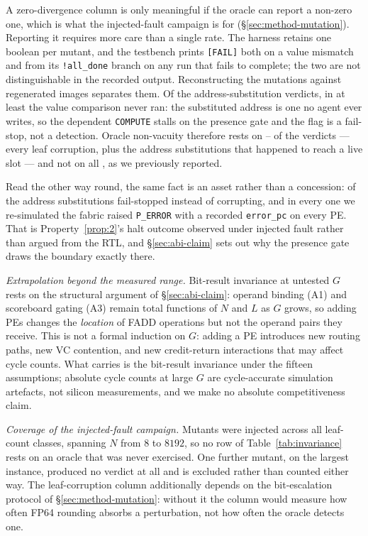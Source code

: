 \documentclass[journal,10pt]{IEEEtran}
\theoremstyle{plain}
\theoremstyle{definition}
\theoremstyle{remark}
\newcommand{\sv}[1]{\texttt{#1}}
\begin{document}
A zero-divergence column is only meaningful if the oracle can report a
non-zero one, which is what the injected-fault campaign is for
(\S\ref{sec:method-mutation}). Reporting it requires more care than a single
rate. The harness retains one boolean per mutant, and the testbench prints
\sv{[FAIL]} both on a value mismatch and from its \sv{!all\_done} branch on
any run that fails to complete; the two are not distinguishable in the
recorded output. Reconstructing the mutations against regenerated images
separates them. Of the \MutVerdicts{} address-substitution verdicts, in at
least \MutNoCompare{} the value comparison never ran: the substituted
address is one no agent ever writes, so the dependent \texttt{COMPUTE}
stalls on the presence gate and the flag is a fail-stop, not a detection.
Oracle non-vacuity therefore rests on \MutOracleLo{}--\MutOracleHi{} of the
\MutTotal{} verdicts --- every leaf corruption, plus the address
substitutions that happened to reach a live slot --- and not on all
\MutTotal{}, as we previously reported.

Read the other way round, the same fact is an asset rather than a
concession: \MutAddrStall{} of the \MutAddrSub{} address substitutions
fail-stopped instead of corrupting, and in every one we re-simulated the
fabric raised \texttt{P\_ERROR} with a recorded \sv{error\_pc} on every PE.
That is Property~\ref{prop:2}'s halt outcome observed under injected fault
rather than argued from the RTL, and \S\ref{sec:abi-claim} sets out why the
presence gate draws the boundary exactly there.

\emph{Extrapolation beyond the measured range.} Bit-result
invariance at untested $G$ rests on the structural argument of
\S\ref{sec:abi-claim}: operand binding (A1) and scoreboard gating (A3)
remain total functions of $N$ and $L$ as $G$ grows, so adding PEs
changes the \emph{location} of FADD operations but not the operand
pairs they receive. This is not a formal induction on $G$: adding a PE
introduces new routing paths, new VC contention, and new credit-return
interactions that may affect cycle counts. What carries is the
bit-result invariance under the fifteen assumptions; absolute cycle
counts at large $G$ are cycle-accurate simulation artefacts, not
silicon measurements, and we make no absolute competitiveness claim.

\emph{Coverage of the injected-fault campaign.} Mutants were injected across
all \InvLeafCounts{} leaf-count classes, spanning $N$ from $8$ to $8192$, so
no row of Table~\ref{tab:invariance} rests on an oracle that was never
exercised. One further mutant, on the largest instance, produced no verdict
at all and is excluded rather than counted either way. The leaf-corruption
column additionally depends on the bit-escalation protocol of
\S\ref{sec:method-mutation}: without it the column would measure how often
FP64 rounding absorbs a perturbation, not how often the oracle detects one.
\end{document}
